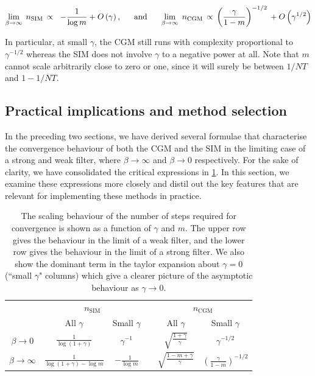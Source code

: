 \begin{equation*}
    \lim_{\beta \rightarrow \infty} \;  n_\text{SIM} \, \propto \;\;  -\frac{1}{\log m} + O\left(\gamma\right), \;\; \quad \text{and} \quad \;\; \lim_{\beta \rightarrow \infty} \;  n_\text{CGM} \, \propto \, \left(\frac{\gamma}{1 - m} \right)^{-1/2} \, + O\left(\gamma^{1/2}\right) 
\end{equation*}


In particular, at small $\gamma$, the CGM still runs with complexity proportional to $\gamma^{-1/2}$ whereas the SIM does not involve $\gamma$ to a negative power at all. Note that $m$ cannot scale arbitrarily close to zero or one, since it will surely be between $1/NT$ and $1 - 1/NT$. 


\subsection{Practical implications and method selection}

In the preceding two sections, we have derived several formulae that characterise the convergence behaviour of both the CGM and the SIM in the limiting case of a strong and weak filter, where $\beta \rightarrow \infty$ and $\beta \rightarrow 0$ respectively. For the sake of clarity, we have consolidated the critical expressions in \cref{tab:conv_SIM_CGM}. In this section, we examine these expressions more closely and distil out the key features that are relevant for implementing these methods in practice.


\begin{table}[t]
    \centering
    \def\arraystretch{1.5}
    \begin{tabular}{@{}cccccc}
    \toprule
    & \multicolumn{2}{c}{$n_\text{SIM}$} & \phantom{abc}& \multicolumn{2}{c}{$n_\text{CGM}$} \\
    \cmidrule{2-3} \cmidrule{5-6}
                               & All $\gamma$   & Small $\gamma$   &&  All $\gamma$   & Small $\gamma$ \\ \midrule \rule{0pt}{1cm}
    $\beta \rightarrow 0$      & $ \displaystyle \frac{1}{\log(1 + \gamma)}$   & $\displaystyle \gamma^{-1}$    &&    $\displaystyle \sqrt{\frac{1 + \gamma}{\gamma}}$ & $\displaystyle \gamma^{-1/2}$    \\ \rule{0pt}{6ex}
    $\beta \rightarrow \infty$ & $\displaystyle \frac{1}{\log(1 + \gamma) - \log m}$ & $\displaystyle -\frac{1}{\log m}$    &&  $\displaystyle \sqrt{\frac{1 - m + \gamma}{\gamma}}$ & $\displaystyle \left(\frac{\gamma}{1 - m} \right)^{-1/2}$ \\[0.5cm] \bottomrule 
    \end{tabular}
    \caption{The scaling behaviour of the number of steps required for convergence is shown as a function of $\gamma$ and $m$. The upper row gives the behaviour in the limit of a weak filter, and the lower row gives the behaviour in the limit of a strong filter. We also show the dominant term in the taylor expansion about $\gamma=0$ (``small $\gamma$" columns) which give a clearer picture of the asymptotic behaviour as $\gamma \rightarrow 0$. }
    \label{tab:conv_SIM_CGM} 
\end{table}

